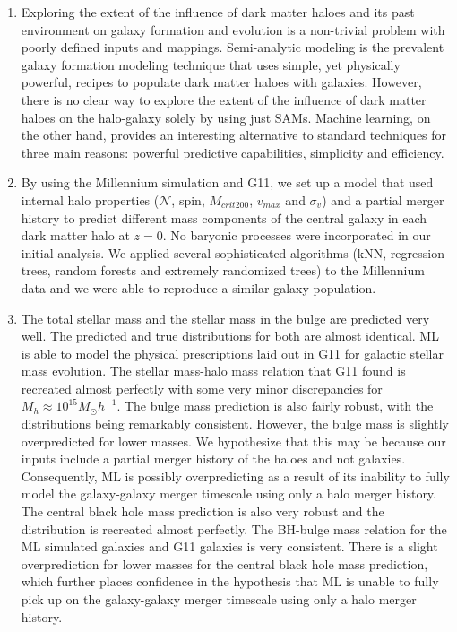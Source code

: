 \documentclass[a4paper,fleqn,usenatbib]{mnras}
\begin{document}
\begin{enumerate}
 \renewcommand{\theenumi}{(\arabic{enumi})}
  \item Exploring the extent of the influence of dark matter haloes and its past environment on galaxy formation and evolution is a non-trivial problem with poorly defined inputs and mappings. Semi-analytic modeling is the prevalent galaxy formation modeling technique that uses simple, yet physically powerful, recipes to populate dark matter haloes with galaxies. However, there is no clear way to explore the extent of the influence of dark matter haloes on the halo-galaxy solely by using just SAMs. Machine learning, on the other hand, provides an interesting alternative to standard techniques for three main reasons: powerful predictive capabilities, simplicity and efficiency. 
  
 \item By using the Millennium simulation and G11, we set up a model that used internal halo properties ($\mathcal{N}$, spin, $M_{crit200}$, $v_{max}$ and $\sigma_v$) and a partial merger history to predict different mass components of the central galaxy in each dark matter halo at $z=0$. No baryonic processes were incorporated in our initial analysis. We applied several sophisticated algorithms (kNN, regression trees, random forests and extremely randomized trees) to the Millennium data and we were able to reproduce a similar galaxy population. 
 
 \item The total stellar mass and the stellar mass in the bulge are predicted very well. The predicted and true distributions for both are almost identical. ML is able to model the physical prescriptions laid out in G11 for galactic stellar mass evolution. The stellar mass-halo mass relation that G11 found is recreated almost perfectly with some very minor discrepancies for $M_h \approx 10^{15} M_{\odot} h^{-1}$. The bulge mass prediction is also fairly robust, with the distributions being remarkably consistent. However, the bulge mass is slightly overpredicted for lower masses. We hypothesize that this may be because our inputs include a partial merger history of the haloes and not galaxies. Consequently, ML is possibly overpredicting as a result of its inability to fully model the galaxy-galaxy merger timescale using only a halo merger history. The central black hole mass prediction is also very robust and the distribution is recreated almost perfectly. The BH-bulge mass relation for the ML simulated galaxies and G11 galaxies is very consistent. There is a slight overprediction for lower masses for the central black hole mass prediction, which further places confidence in the hypothesis that ML is unable to fully pick up on the galaxy-galaxy merger timescale using only a halo merger history. 
 

\end{enumerate}
\end{document}
